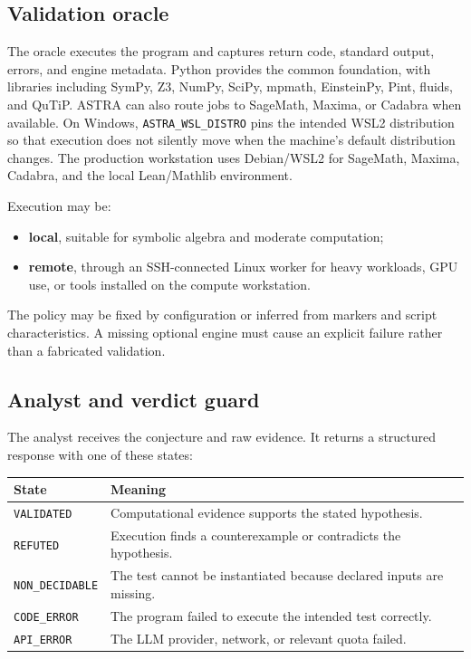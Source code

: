 \documentclass[11pt,a4paper]{article}
\begin{document}
\subsection{Validation oracle}

The oracle executes the program and captures return code, standard output, errors, and engine metadata. Python provides the common foundation, with libraries including SymPy, Z3, NumPy, SciPy, mpmath, EinsteinPy, Pint, fluids, and QuTiP. ASTRA can also route jobs to SageMath, Maxima, or Cadabra when available. On Windows, \texttt{ASTRA\_WSL\_DISTRO} pins the intended WSL2 distribution so that execution does not silently move when the machine's default distribution changes. The production workstation uses Debian/WSL2 for SageMath, Maxima, Cadabra, and the local Lean/Mathlib environment.

Execution may be:

\begin{itemize}
  \item \textbf{local}, suitable for symbolic algebra and moderate computation;
  \item \textbf{remote}, through an SSH-connected Linux worker for heavy workloads, GPU use, or tools installed on the compute workstation.
\end{itemize}

The policy may be fixed by configuration or inferred from markers and script characteristics. A missing optional engine must cause an explicit failure rather than a fabricated validation.

\subsection{Analyst and verdict guard}

The analyst receives the conjecture and raw evidence. It returns a structured response with one of these states:

\begin{center}
\begin{tabular}{@{}ll@{}}
\toprule
State & Meaning \\
\midrule
\texttt{VALIDATED} & Computational evidence supports the stated hypothesis. \\
\texttt{REFUTED} & Execution finds a counterexample or contradicts the hypothesis. \\
\texttt{NON\_DECIDABLE} & The test cannot be instantiated because declared inputs are missing. \\
\texttt{CODE\_ERROR} & The program failed to execute the intended test correctly. \\
\texttt{API\_ERROR} & The LLM provider, network, or relevant quota failed. \\
\bottomrule
\end{tabular}
\end{center}
\end{document}
